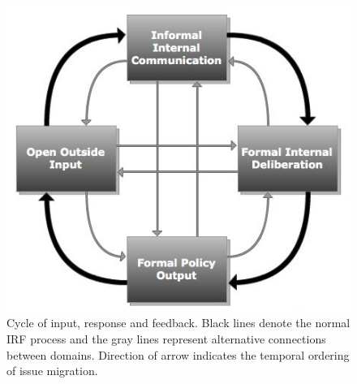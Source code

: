 \begin{figure}
\vspace{-.5cm}
\begin{center}
\includegraphics[scale=.525]{cycle.jpg}
\end{center}
\vspace{-.5cm}
\caption{Cycle of input, response and feedback. Black lines denote the normal IRF process and the gray lines represent alternative connections between domains. Direction of arrow indicates the temporal ordering of issue migration.}
\label{cycle}
\end{figure}

